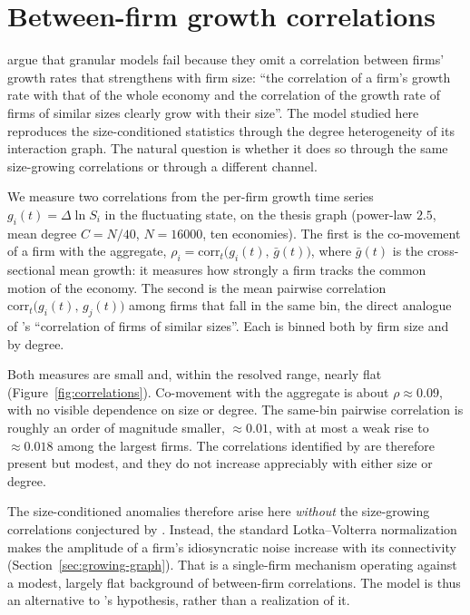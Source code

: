 \chapter{Between-firm growth correlations}
\label{app:correlations}

\citet{moran2024} argue that granular models fail because they omit a correlation between firms'
growth rates that strengthens with firm size: ``the correlation of a firm's growth rate with that
of the whole economy and the correlation of the growth rate of firms of similar sizes clearly grow
with their size''. The model studied here reproduces the size-conditioned statistics through the
degree heterogeneity of its interaction graph. The natural question is whether it does so through
the same size-growing correlations or through a different channel.

We measure two correlations from the per-firm growth time series $g_i(t) = \Delta \ln S_i$ in the
fluctuating state, on the thesis graph (power-law $2.5$, mean degree $C = N/40$, $N = 16000$, ten
economies). The first is the co-movement of a firm with the aggregate,
$\rho_i = \mathrm{corr}_t\!\big(g_i(t),\,\bar g(t)\big)$, where $\bar g(t)$ is the
cross-sectional mean growth: it measures how strongly a firm tracks the common motion of the
economy. The second is the mean pairwise correlation
$\mathrm{corr}_t\!\big(g_i(t),\,g_j(t)\big)$ among firms that fall in the same bin, the direct
analogue of \citet{moran2024}'s ``correlation of firms of similar sizes''. Each is binned both by
firm size and by degree.

Both measures are small and, within the resolved range, nearly flat
(Figure~\ref{fig:correlations}). Co-movement with the aggregate is about $\rho \approx 0.09$,
with no visible dependence on size or degree. The same-bin pairwise correlation is roughly an
order of magnitude smaller, $\approx 0.01$, with at most a weak rise to $\approx 0.018$ among the
largest firms. The correlations identified by \citet{moran2024} are therefore present but modest,
and they do not increase appreciably with either size or degree.

The size-conditioned anomalies therefore arise here \emph{without} the size-growing correlations
conjectured by \citet{moran2024}. Instead, the standard Lotka--Volterra normalization makes the amplitude of a
firm's idiosyncratic noise increase with its connectivity
(Section~\ref{sec:growing-graph}). That is a single-firm mechanism operating against a modest,
largely flat background of between-firm correlations. The model is thus an alternative to
\citet{moran2024}'s hypothesis, rather than a realization of it.

